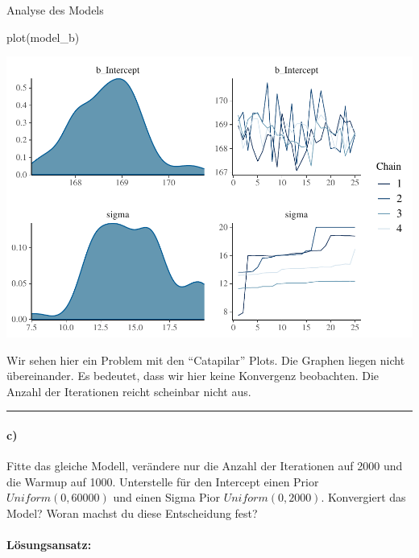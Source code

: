 \documentclass[
]{article}
\newenvironment{Shaded}{\begin{snugshade}}{\end{snugshade}}
\newcommand{\FunctionTok}[1]{\textcolor[rgb]{0.00,0.00,0.00}{#1}}
\newcommand{\NormalTok}[1]{#1}
\begin{document}
Analyse des Models

\begin{Shaded}
\begin{Highlighting}[]
\FunctionTok{plot}\NormalTok{(model\_b)}
\end{Highlighting}
\end{Shaded}

\includegraphics{Loesung-Zettel-2_files/figure-latex/unnamed-chunk-2-1.pdf}

Wir sehen hier ein Problem mit den ``Catapilar'' Plots. Die Graphen
liegen nicht übereinander. Es bedeutet, dass wir hier keine Konvergenz
beobachten. Die Anzahl der Iterationen reicht scheinbar nicht aus.

\begin{center}\rule{0.5\linewidth}{0.5pt}\end{center}

\hypertarget{c}{%
\paragraph{c)}\label{c}}

Fitte das gleiche Modell, verändere nur die Anzahl der Iterationen auf
2000 und die Warmup auf 1000. Unterstelle für den Intercept einen Prior
\(Uniform(0, 60000)\) und einen Sigma Pior \(Uniform(0, 2000)\).
Konvergiert das Model? Woran machst du diese Entscheidung fest?

\hypertarget{luxf6sungsansatz-2}{%
\paragraph{Lösungsansatz:}\label{luxf6sungsansatz-2}}
\end{document}
